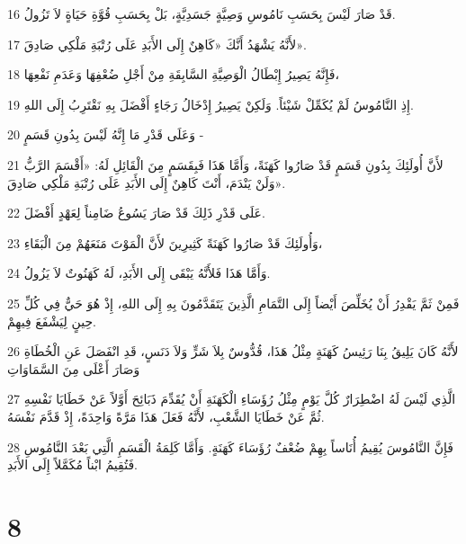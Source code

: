 \par 16 قَدْ صَارَ لَيْسَ بِحَسَبِ نَامُوسِ وَصِيَّةٍ جَسَدِيَّةٍ، بَلْ بِحَسَبِ قُوَّةِ حَيَاةٍ لاَ تَزُولُ.
\par 17 لأَنَّهُ يَشْهَدُ أَنَّكَ «كَاهِنٌ إِلَى الأَبَدِ عَلَى رُتْبَةِ مَلْكِي صَادِقَ».
\par 18 فَإِنَّهُ يَصِيرُ إِبْطَالُ الْوَصِيَّةِ السَّابِقَةِ مِنْ أَجْلِ ضُعْفِهَا وَعَدَمِ نَفْعِهَا،
\par 19 إِذِ النَّامُوسُ لَمْ يُكَمِّلْ شَيْئاً. وَلَكِنْ يَصِيرُ إِدْخَالُ رَجَاءٍ أَفْضَلَ بِهِ نَقْتَرِبُ إِلَى اللهِ.
\par 20 وَعَلَى قَدْرِ مَا إِنَّهُ لَيْسَ بِدُونِ قَسَمٍ -
\par 21 لأَنَّ أُولَئِكَ بِدُونِ قَسَمٍ قَدْ صَارُوا كَهَنَةً، وَأَمَّا هَذَا فَبِقَسَمٍ مِنَ الْقَائِلِ لَهُ: «أَقْسَمَ الرَّبُّ وَلَنْ يَنْدَمَ، أَنْتَ كَاهِنٌ إِلَى الأَبَدِ عَلَى رُتْبَةِ مَلْكِي صَادِقَ».
\par 22 عَلَى قَدْرِ ذَلِكَ قَدْ صَارَ يَسُوعُ ضَامِناً لِعَهْدٍ أَفْضَلَ.
\par 23 وَأُولَئِكَ قَدْ صَارُوا كَهَنَةً كَثِيرِينَ لأَنَّ الْمَوْتَ مَنَعَهُمْ مِنَ الْبَقَاءِ،
\par 24 وَأَمَّا هَذَا فَلأَنَّهُ يَبْقَى إِلَى الأَبَدِ، لَهُ كَهَنُوتٌ لاَ يَزُولُ.
\par 25 فَمِنْ ثَمَّ يَقْدِرُ أَنْ يُخَلِّصَ أَيْضاً إِلَى التَّمَامِ الَّذِينَ يَتَقَدَّمُونَ بِهِ إِلَى اللهِ، إِذْ هُوَ حَيٌّ فِي كُلِّ حِينٍ لِيَشْفَعَ فِيهِمْ.
\par 26 لأَنَّهُ كَانَ يَلِيقُ بِنَا رَئِيسُ كَهَنَةٍ مِثْلُ هَذَا، قُدُّوسٌ بِلاَ شَرٍّ وَلاَ دَنَسٍ، قَدِ انْفَصَلَ عَنِ الْخُطَاةِ وَصَارَ أَعْلَى مِنَ السَّمَاوَاتِ
\par 27 الَّذِي لَيْسَ لَهُ اضْطِرَارٌ كُلَّ يَوْمٍ مِثْلُ رُؤَسَاءِ الْكَهَنَةِ أَنْ يُقَدِّمَ ذَبَائِحَ أَوَّلاً عَنْ خَطَايَا نَفْسِهِ ثُمَّ عَنْ خَطَايَا الشَّعْبِ، لأَنَّهُ فَعَلَ هَذَا مَرَّةً وَاحِدَةً، إِذْ قَدَّمَ نَفْسَهُ.
\par 28 فَإِنَّ النَّامُوسَ يُقِيمُ أُنَاساً بِهِمْ ضُعْفٌ رُؤَسَاءَ كَهَنَةٍ. وَأَمَّا كَلِمَةُ الْقَسَمِ الَّتِي بَعْدَ النَّامُوسِ فَتُقِيمُ ابْناً مُكَمَّلاً إِلَى الأَبَدِ.

\chapter{8}


